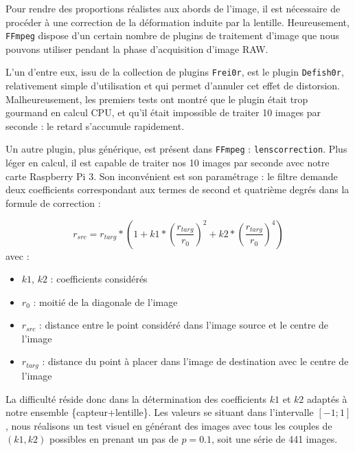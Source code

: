 \documentclass[11pt,a4paper]{article}
\begin{document}
Pour rendre des proportions réalistes aux abords de l'image, il est nécessaire de procéder à une correction de la déformation induite par la lentille.
Heureusement, \texttt{FFmpeg} dispose d'un certain nombre de plugins de traitement d'image que nous pouvons utiliser pendant la phase d'acquisition d'image RAW.

\bigbreak
L'un d'entre eux, issu de la collection de plugins \texttt{Frei0r}, est le plugin \texttt{Defish0r}, relativement simple d'utilisation et qui permet d'annuler cet effet de distorsion.
Malheureusement, les premiers tests ont montré que le plugin était trop gourmand en calcul CPU, et qu'il était impossible de traiter 10 images par seconde : le retard s'accumule rapidement.

\bigbreak
Un autre plugin, plus générique, est présent dans \texttt{FFmpeg} : \texttt{lenscorrection}.
Plus léger en calcul, il est capable de traiter nos 10 images par seconde avec notre carte Raspberry Pi 3.
Son inconvénient est son paramétrage : le filtre demande deux coefficients correspondant aux termes de second et quatrième degrés dans la formule de correction :

$$r_{src} = r_{targ} * (1 + k1*(\frac{r_{targ}}{r_0})^2 + k2*(\frac{r_{targ}}{r_0})^4)$$
avec :
\begin{itemize}
\item{$k1$, $k2$ : coefficients considérés}
\item{$r_0$ : moitié de la diagonale de l'image}
\item{$r_{src}$ : distance entre le point considéré dans l'image source et le centre de l'image}
\item{$r_{targ}$ : distance du point à placer dans l'image de destination avec le centre de l'image}
\end{itemize}

\bigbreak

La difficulté réside donc dans la détermination des coefficients $k1$ et $k2$ adaptés à notre ensemble \{capteur+lentille\}.
Les valeurs se situant dans l'intervalle $[-1;1]$, nous réalisons un test visuel en générant des images avec tous les couples de $(k1, k2)$ possibles en prenant un pas de $p=0.1$, soit une série de 441 images.
\end{document}
